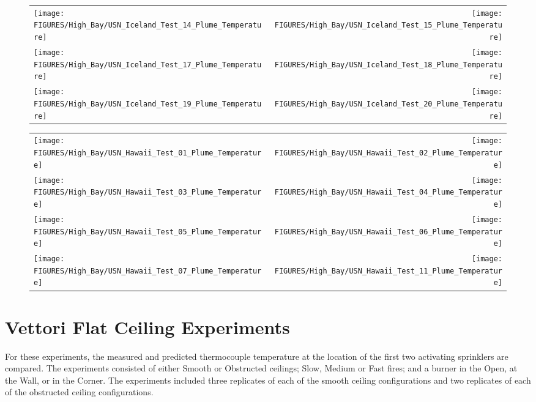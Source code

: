\begin{figure}[p]
\begin{tabular*}{\textwidth}{l@{\extracolsep{\fill}}r}
\texttt{[image: FIGURES/High\_Bay/USN\_Iceland\_Test\_14\_Plume\_Temperature]} &
\texttt{[image: FIGURES/High\_Bay/USN\_Iceland\_Test\_15\_Plume\_Temperature]} \\
\texttt{[image: FIGURES/High\_Bay/USN\_Iceland\_Test\_17\_Plume\_Temperature]} &
\texttt{[image: FIGURES/High\_Bay/USN\_Iceland\_Test\_18\_Plume\_Temperature]} \\
\texttt{[image: FIGURES/High\_Bay/USN\_Iceland\_Test\_19\_Plume\_Temperature]} &
\texttt{[image: FIGURES/High\_Bay/USN\_Iceland\_Test\_20\_Plume\_Temperature]} \\
\end{tabular*}
\label{USN_Plume_Iceland_3}
\end{figure}

\begin{figure}[p]
\begin{tabular*}{\textwidth}{l@{\extracolsep{\fill}}r}
\texttt{[image: FIGURES/High\_Bay/USN\_Hawaii\_Test\_01\_Plume\_Temperature]} &
\texttt{[image: FIGURES/High\_Bay/USN\_Hawaii\_Test\_02\_Plume\_Temperature]} \\
\texttt{[image: FIGURES/High\_Bay/USN\_Hawaii\_Test\_03\_Plume\_Temperature]} &
\texttt{[image: FIGURES/High\_Bay/USN\_Hawaii\_Test\_04\_Plume\_Temperature]} \\
\texttt{[image: FIGURES/High\_Bay/USN\_Hawaii\_Test\_05\_Plume\_Temperature]} &
\texttt{[image: FIGURES/High\_Bay/USN\_Hawaii\_Test\_06\_Plume\_Temperature]} \\
\texttt{[image: FIGURES/High\_Bay/USN\_Hawaii\_Test\_07\_Plume\_Temperature]} &
\texttt{[image: FIGURES/High\_Bay/USN\_Hawaii\_Test\_11\_Plume\_Temperature]}
\end{tabular*}
\label{USN_Plume_Hawaii}
\end{figure}

\clearpage

\section{Vettori Flat Ceiling Experiments}
\label{Vettori_Flat_Results}

For these experiments, the measured and predicted thermocouple temperature at the location of the first two activating sprinklers are compared. The experiments consisted of either Smooth or Obstructed ceilings; Slow, Medium or Fast fires; and a burner in the Open, at the Wall, or in the Corner. The experiments included three replicates of each of the smooth ceiling configurations and two replicates of each of the obstructed ceiling configurations.


